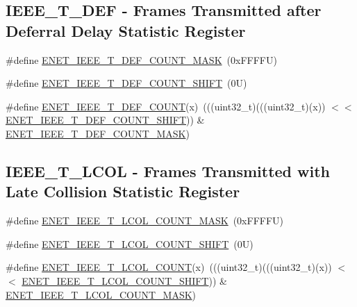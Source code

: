 \subsection*{I\+E\+E\+E\+\_\+\+T\+\_\+\+D\+EF -\/ Frames Transmitted after Deferral Delay Statistic Register}
\begin{DoxyCompactItemize}
\item 
\#define \mbox{\hyperlink{group___e_n_e_t___register___masks_gaa51a7b5a53afb1d47cba1d900f9bf34f}{E\+N\+E\+T\+\_\+\+I\+E\+E\+E\+\_\+\+T\+\_\+\+D\+E\+F\+\_\+\+C\+O\+U\+N\+T\+\_\+\+M\+A\+SK}}~(0x\+F\+F\+F\+F\+U)
\item 
\#define \mbox{\hyperlink{group___e_n_e_t___register___masks_gabbce06689e842f4caf2a19b2df8893c6}{E\+N\+E\+T\+\_\+\+I\+E\+E\+E\+\_\+\+T\+\_\+\+D\+E\+F\+\_\+\+C\+O\+U\+N\+T\+\_\+\+S\+H\+I\+FT}}~(0\+U)
\item 
\#define \mbox{\hyperlink{group___e_n_e_t___register___masks_ga31ed2c1faca96c342cc4f2f9cc304d23}{E\+N\+E\+T\+\_\+\+I\+E\+E\+E\+\_\+\+T\+\_\+\+D\+E\+F\+\_\+\+C\+O\+U\+NT}}(x)~(((uint32\+\_\+t)(((uint32\+\_\+t)(x)) $<$$<$ \mbox{\hyperlink{group___e_n_e_t___register___masks_gabbce06689e842f4caf2a19b2df8893c6}{E\+N\+E\+T\+\_\+\+I\+E\+E\+E\+\_\+\+T\+\_\+\+D\+E\+F\+\_\+\+C\+O\+U\+N\+T\+\_\+\+S\+H\+I\+FT}})) \& \mbox{\hyperlink{group___e_n_e_t___register___masks_gaa51a7b5a53afb1d47cba1d900f9bf34f}{E\+N\+E\+T\+\_\+\+I\+E\+E\+E\+\_\+\+T\+\_\+\+D\+E\+F\+\_\+\+C\+O\+U\+N\+T\+\_\+\+M\+A\+SK}})
\end{DoxyCompactItemize}
\subsection*{I\+E\+E\+E\+\_\+\+T\+\_\+\+L\+C\+OL -\/ Frames Transmitted with Late Collision Statistic Register}
\begin{DoxyCompactItemize}
\item 
\#define \mbox{\hyperlink{group___e_n_e_t___register___masks_ga041ada9082f15cabd8d535dba84fbfba}{E\+N\+E\+T\+\_\+\+I\+E\+E\+E\+\_\+\+T\+\_\+\+L\+C\+O\+L\+\_\+\+C\+O\+U\+N\+T\+\_\+\+M\+A\+SK}}~(0x\+F\+F\+F\+F\+U)
\item 
\#define \mbox{\hyperlink{group___e_n_e_t___register___masks_ga2c352d386efb6087a1449f6ff8e49e28}{E\+N\+E\+T\+\_\+\+I\+E\+E\+E\+\_\+\+T\+\_\+\+L\+C\+O\+L\+\_\+\+C\+O\+U\+N\+T\+\_\+\+S\+H\+I\+FT}}~(0\+U)
\item 
\#define \mbox{\hyperlink{group___e_n_e_t___register___masks_ga3b0b578f77880f92db4d4515d5307a67}{E\+N\+E\+T\+\_\+\+I\+E\+E\+E\+\_\+\+T\+\_\+\+L\+C\+O\+L\+\_\+\+C\+O\+U\+NT}}(x)~(((uint32\+\_\+t)(((uint32\+\_\+t)(x)) $<$$<$ \mbox{\hyperlink{group___e_n_e_t___register___masks_ga2c352d386efb6087a1449f6ff8e49e28}{E\+N\+E\+T\+\_\+\+I\+E\+E\+E\+\_\+\+T\+\_\+\+L\+C\+O\+L\+\_\+\+C\+O\+U\+N\+T\+\_\+\+S\+H\+I\+FT}})) \& \mbox{\hyperlink{group___e_n_e_t___register___masks_ga041ada9082f15cabd8d535dba84fbfba}{E\+N\+E\+T\+\_\+\+I\+E\+E\+E\+\_\+\+T\+\_\+\+L\+C\+O\+L\+\_\+\+C\+O\+U\+N\+T\+\_\+\+M\+A\+SK}})
\end{DoxyCompactItemize}
